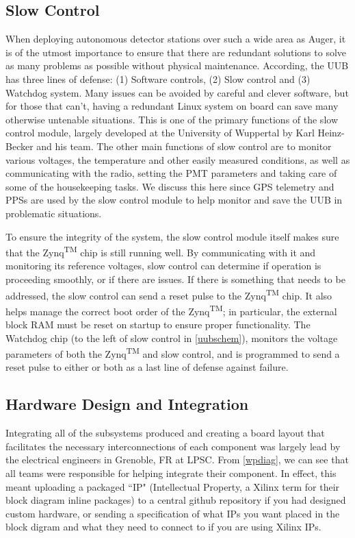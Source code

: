 \subsection{Slow Control}
When deploying autonomous detector stations over such a wide area as Auger, it is of the utmost importance to ensure that there are redundant solutions to solve as many problems as possible without physical maintenance. According, the UUB has three lines of defense: (1) Software controls, (2) Slow control and (3) Watchdog system. Many issues can be avoided by careful and clever software, but for those that can't, having a redundant Linux system on board can save many otherwise untenable situations. This is one of the primary functions of the slow control module, largely developed at the University of Wuppertal by Karl Heinz-Becker and his team. The other main functions of slow control are to monitor various voltages, the temperature and other easily measured conditions, as well as communicating with the radio, setting the PMT parameters and taking care of some of the housekeeping tasks. We discuss this here since GPS telemetry and PPSs are used by the slow control module to help monitor and save the UUB in problematic situations.

To ensure the integrity of the system, the slow control module itself makes sure that the Zynq\textsuperscript{TM} chip is still running well. By communicating with it and monitoring its reference voltages, slow control can determine if operation is proceeding smoothly, or if there are issues. If there is something that needs to be addressed, the slow control can send a reset pulse to the Zynq\textsuperscript{TM} chip. It also helps manage the correct boot order of the Zynq\textsuperscript{TM}; in particular, the external block RAM must be reset on startup to ensure proper functionality. The Watchdog chip (to the left of slow control in \autoref{uubschem}), monitors the voltage parameters of both the Zynq\textsuperscript{TM} and slow control, and is programmed to send a reset pulse to either or both as a last line of defense against failure.
\subsection{Hardware Design and Integration}
Integrating all of the subsystems produced and creating a board layout that facilitates the necessary interconnections of each component was largely lead by the electrical engineers in Grenoble, FR at LPSC. From \autoref{wpdiag}, we can see that all teams were responsible for helping integrate their component. In effect, this meant uploading a packaged ``IP" (Intellectual Property, a Xilinx term for their block diagram inline packages) to a central github repository if you had designed custom hardware, or sending a specification of what IPs you want placed in the block digram and what they need to connect to if you are using Xilinx IPs. 

